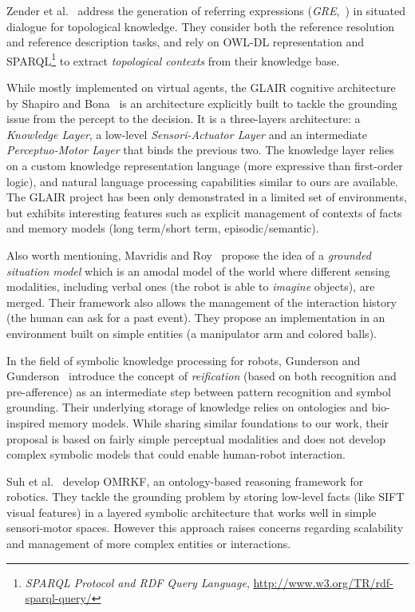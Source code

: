 \documentclass[twocolumn]{svjour3}
\begin{document}
Zender et al.~\cite{Zender2009} address the generation of referring expressions
(\emph{GRE},~\cite{Dale1995}) in situated dialogue for topological knowledge.  They consider
both the reference resolution and reference description tasks, and rely on
OWL-DL representation and SPARQL\footnote{{\em SPARQL Protocol and RDF Query
Language}, \url{http://www.w3.org/TR/rdf-sparql-query/}} to extract
\emph{topological contexts} from their knowledge base.

While mostly implemented on virtual agents, the GLAIR cognitive architecture by
Shapiro and Bona~\cite{Shapiro2009} is an architecture explicitly built to
tackle the grounding issue from the percept to the decision. It is a
three-layers architecture: a \emph{Knowledge Layer}, a low-level
\emph{Sensori-Actuator Layer} and an intermediate \emph{Perceptuo-Motor Layer}
that binds the previous two.  The knowledge layer relies on a custom knowledge
representation language (more expressive than first-order logic), and natural
language processing capabilities similar to ours are available. The GLAIR
project has been only demonstrated in a limited set of environments, but
exhibits interesting features such as explicit management of contexts of facts
and memory models (long term/short term, episodic/semantic).

Also worth mentioning, Mavridis and Roy~\cite{Mavridis2005} propose the idea of
a \emph{grounded situation model} which is an amodal model of the world where
different sensing modalities, including verbal ones (the robot is able to
\emph{imagine} objects), are merged. Their framework also allows the management of
the interaction history (the human can ask for a past event). They propose an
implementation in an environment built on simple entities (a manipulator arm
and colored balls).

In the field of symbolic knowledge processing for robots, Gunderson and
Gunderson~\cite{Gunderson2008} introduce the concept of \emph{reification}
(based on both recognition and pre-afference) as an intermediate step between
pattern recognition and symbol grounding. Their underlying storage of knowledge
relies on ontologies and bio-inspired memory models. While sharing similar
foundations to our work, their proposal is based on fairly simple perceptual
modalities and does not develop complex symbolic models that could enable
human-robot interaction.

Suh et al.~\cite{Suh2007} develop {\sc OMRKF}, an ontology-based reasoning
framework for robotics. They tackle the grounding problem by storing low-level
facts (like SIFT visual features) in a layered symbolic architecture that works
well in simple sensori-motor spaces. However this approach raises concerns
regarding scalability and management of more complex entities or interactions.
\end{document}
